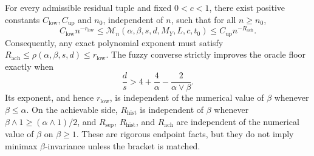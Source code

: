 For every admissible residual tuple and fixed \(0<c<1\), there exist positive constants \(C_{\mathrm{low}},C_{\mathrm{up}}\) and \(n_0\), independent of \(n\), such that for all \(n\ge n_0\), \[ C_{\mathrm{low}}n^{-r_{\mathrm{low}}}\le \mathcal M_n(\alpha,\beta,s,d,M_Y,L,c,t_0)\le C_{\mathrm{up}}n^{-R_{\mathrm{ach}}}. \] Consequently, any exact polynomial exponent must satisfy \(R_{\mathrm{ach}}\le\rho(\alpha,\beta,s,d)\le r_{\mathrm{low}}\). The fuzzy converse strictly improves the oracle floor exactly when \[ \frac ds>4+\frac4\alpha-\frac{2}{\alpha\vee\beta}. \] Its exponent, and hence \(r_{\mathrm{low}}\), is independent of the numerical value of \(\beta\) whenever \(\beta\le\alpha\). On the achievable side, \(R_{\mathrm{hist}}\) is independent of \(\beta\) whenever \(\beta\wedge1\ge(\alpha\wedge1)/2\), and \(R_{\mathrm{sep}}\), \(R_{\mathrm{hist}}\), and \(R_{\mathrm{ach}}\) are independent of the numerical value of \(\beta\) on \(\beta\ge1\). These are rigorous endpoint facts, but they do not imply minimax \(\beta\)-invariance unless the bracket is matched.
